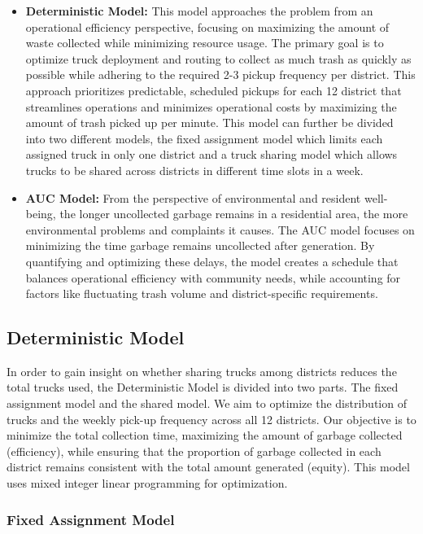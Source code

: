 \documentclass{article}
\begin{document}
\begin{itemize}
    \item \textbf{Deterministic Model:} This model approaches the problem from an operational efficiency perspective, focusing on maximizing the amount of waste collected while minimizing resource usage. The primary goal is to optimize truck deployment and routing to collect as much trash as quickly as possible while adhering to the required 2-3 pickup frequency per district. This approach prioritizes predictable, scheduled pickups for each 12 district that streamlines operations and minimizes operational costs by maximizing the amount of trash picked up per minute. This model can further be divided into two different models, the fixed assignment model which limits each assigned truck in only one district and a truck sharing model which allows trucks to be shared across districts in different time slots in a week. 

    \item \textbf{AUC Model:} From the perspective of environmental and resident well-being, the longer uncollected garbage remains in a residential area, the more environmental problems and complaints it causes. The AUC model focuses on minimizing the time garbage remains uncollected after generation. By quantifying and optimizing these delays, the model creates a schedule that balances operational efficiency with community needs, while accounting for factors like fluctuating trash volume and district-specific requirements.
\end{itemize}

\subsection{Deterministic Model}

In order to gain insight on whether sharing trucks among districts reduces the total trucks used, the Deterministic Model is divided into two parts. The fixed assignment model and the shared model. We aim to optimize the distribution of trucks and the weekly pick-up frequency across all 12 districts. Our objective is to minimize the total collection time, maximizing the amount of garbage collected (efficiency), while ensuring that the proportion of garbage collected in each district remains consistent with the total amount generated (equity). This model uses mixed integer linear programming for optimization.

\subsubsection{Fixed Assignment Model}
\end{document}
